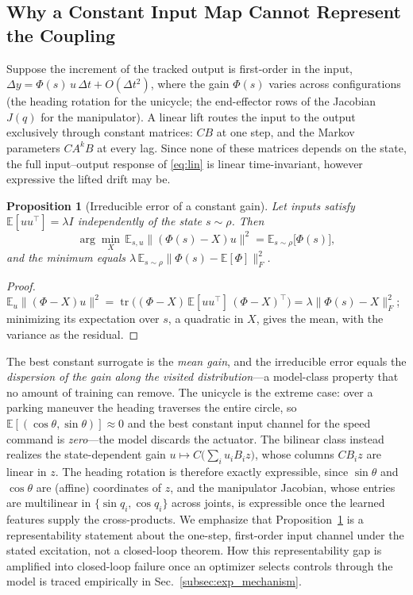 \documentclass[lettersize,journal]{IEEEtran}
\newtheorem{proposition}{Proposition}
\theoremstyle{remark}
\begin{document}
\subsection{Why a Constant Input Map Cannot Represent the Coupling}\label{subsec:representability}

Suppose the increment of the tracked output is first-order in the input,
$\Delta y = \Phi(s)\, u\, \Delta t + O(\Delta t^{2})$, where the gain
$\Phi(s)$ varies across configurations (the heading rotation for the
unicycle; the end-effector rows of the Jacobian $J(q)$ for the
manipulator). A linear lift routes the input to the output exclusively through
constant matrices: $CB$ at one step, and the Markov parameters
$C A^{k} B$ at every lag. Since none of these matrices depends on the
state, the full input--output response of \eqref{eq:lin} is linear
time-invariant, however expressive the lifted drift may be.

\begin{proposition}[Irreducible error of a constant gain]
\label{prop:const}
Let inputs satisfy $\mathbb{E}[u u^{\top}] = \lambda I$ independently of
the state $s \sim \rho$. Then
\begin{equation}
\arg\min_{X}\, \mathbb{E}_{s,u}\big\|(\Phi(s) - X) u\big\|^{2}
= \mathbb{E}_{s \sim \rho}\big[\Phi(s)\big],
\label{eq:meangain}
\end{equation}
and the minimum equals
$\lambda\, \mathbb{E}_{s \sim \rho}\big\| \Phi(s) -
\mathbb{E}[\Phi] \big\|_{F}^{2}$.
\end{proposition}
\begin{proof}
$\mathbb{E}_u \|(\Phi - X) u\|^{2}
= \operatorname{tr}\big((\Phi - X)\, \mathbb{E}[u u^{\top}]\,
(\Phi - X)^{\top}\big) = \lambda \|\Phi(s) - X\|_{F}^{2}$; minimizing its
expectation over $s$, a quadratic in $X$, gives the mean, with the variance
as the residual.
\end{proof}

The best constant surrogate is the \emph{mean gain}, and the irreducible
error equals the \emph{dispersion of the gain along the visited
distribution}---a model-class property that no amount of training can
remove. The unicycle is the extreme case: over a parking maneuver the
heading traverses the entire circle, so
$\mathbb{E}[(\cos\theta, \sin\theta)] \approx 0$ and the best constant
input channel for the speed command is \emph{zero}---the
model discards the actuator. The bilinear class instead realizes the
state-dependent gain $u \mapsto C\big(\sum_i u_i B_i z\big)$, whose
columns $C B_i z$ are linear in $z$. The heading rotation is therefore
exactly expressible, since $\sin\theta$ and $\cos\theta$ are (affine)
coordinates of $z$, and the manipulator Jacobian, whose entries are
multilinear in $\{\sin q_i, \cos q_i\}$ across joints, is expressible
once the learned features supply the cross-products. We emphasize that
Proposition~\ref{prop:const} is a representability statement about the
one-step, first-order input channel under the stated excitation, not a
closed-loop theorem. How this representability gap is amplified into
closed-loop failure once an optimizer selects controls through the
model is traced empirically in Sec.~\ref{subsec:exp_mechanism}.
\end{document}
